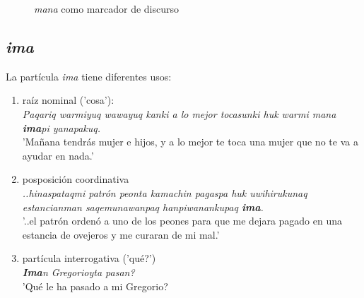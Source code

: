\documentclass[a4paper,11pt,DIV12]{scrartcl}
\begin{document}
\begin{figure}
\begin{center}
 \caption{{\em mana} como marcador de discurso}\label{Fig:manadm}
\end{center}
\end{figure}


  \subsection{{\em ima}}
La part\'icula {\em ima} tiene diferentes usos:
\begin{enumerate}
 \item ra\'iz nominal ('cosa'):\\
       {\em Paqariq warmiyuq wawayuq kanki a lo mejor tocasunki huk warmi mana \textbf{ima}pi yanapakuq.}\\
	'Mañana tendrás mujer e hijos, y a lo mejor te toca una mujer que no te va a ayudar en nada.'\\
	\hfill{\small \citep{Valderrama77}}
 \item posposici\'on coordinativa\\
{\em  ..hinaspataqmi patrón peonta kamachin pagaspa huk uwihirukunaq estancianman saqemunawanpaq hanpiwanankupaq \textbf{ima}.}\\
 '..el patrón ordenó a uno de los peones para que me dejara pagado en una estancia de ovejeros y me curaran de mi mal.'\\
	\hfill{\small \citep{Valderrama77}}
 \item part\'icula interrogativa ('qu\'e?')\\
       {\em \textbf{Ima}n Gregorioyta pasan?}\\
      '{\textquestiondown}Qué le ha pasado a mi Gregorio?\\
	\hfill{\small \citep{Valderrama77}}		
\end{enumerate}
\end{document}
